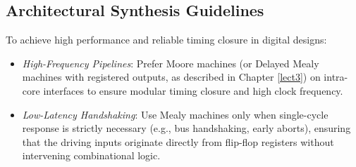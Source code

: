 \subsection{Architectural Synthesis Guidelines}
To achieve high performance and reliable timing closure in digital designs:
\begin{itemize}
    \item \textit{High-Frequency Pipelines}: Prefer Moore machines (or Delayed Mealy machines with registered outputs, as described in Chapter \ref{lect3}) on intra-core interfaces to ensure modular timing closure and high clock frequency.
    \item \textit{Low-Latency Handshaking}: Use Mealy machines only when single-cycle response is strictly necessary (e.g., bus handshaking, early aborts), ensuring that the driving inputs originate directly from flip-flop registers without intervening combinational logic.
\end{itemize}